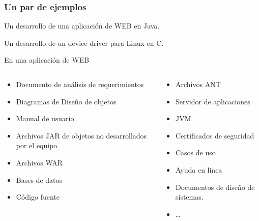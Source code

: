 \begin{frame}
	\frametitle{Un par de ejemplos}
	Un desarrollo de una aplicaci\'on de WEB en Java.

	Un desarrollo de un device driver para Linux en C. 
\end{frame}
\begin{frame}
	En una aplicaci\'on de WEB 
	\begin{columns}
		\begin{column}{0.5\textwidth}
			\begin{itemize}
				\item Documento de an\'alisis de requerimientos
				\item Diagramas de Dise\~no de objetos
				\item Manual de usuario
				\item Archivos JAR de objetos no desarrollados por el equipo
				\item Archivos WAR
				\item Bases de datos
				\item C\'odigo fuente
			\end{itemize}
		\end{column}
		\begin{column}{0.5\textwidth}
			\begin{itemize}
				\item Archivos ANT
				\item Servidor de aplicaciones				\item JVM
				\item Certificados de seguridad
				\item Casos de uso
				\item Ayuda en linea
				\item Documentos de dise\~no de sistemas.
				\item \ldots
			\end{itemize}
		\end{column}
	\end{columns}
\end{frame}

